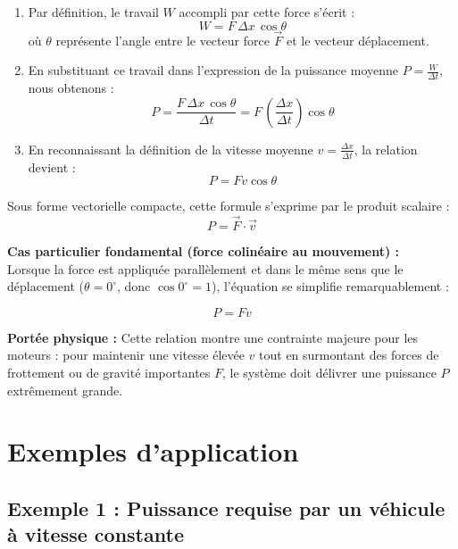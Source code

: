 \documentclass[11pt,openany]{book}
\begin{document}
\begin{enumerate}
    \item Par définition, le travail $W$ accompli par cette force s'écrit :
    \[
    W = F \, \Delta x \, \cos\theta
    \]
    où $\theta$ représente l'angle entre le vecteur force $\vec{F}$ et le vecteur déplacement.

    \item En substituant ce travail dans l'expression de la puissance moyenne $P = \frac{W}{\Delta t}$, nous obtenons :
    \[
    P = \frac{F \, \Delta x \, \cos\theta}{\Delta t} = F \, \left( \frac{\Delta x}{\Delta t} \right) \cos\theta
    \]

    \item En reconnaissant la définition de la vitesse moyenne $v = \frac{\Delta x}{\Delta t}$, la relation devient :
    \[
    \boxed{P = F v \cos\theta}
    \]
\end{enumerate}

Sous forme vectorielle compacte, cette formule s'exprime par le produit scalaire :
\[
\boxed{P = \vec{F} \cdot \vec{v}}
\]

\vspace{0.2cm}

\noindent\textbf{Cas particulier fondamental (force colinéaire au mouvement) :} \\
Lorsque la force est appliquée parallèlement et dans le même sens que le déplacement ($\theta = 0^\circ$, donc $\cos 0^\circ = 1$), l'équation se simplifie remarquablement :

\[
\boxed{P = F v}
\]

\vspace{0.2cm}

\noindent\textbf{Portée physique :} Cette relation montre une contrainte majeure pour les moteurs : pour maintenir une vitesse élevée $v$ tout en surmontant des forces de frottement ou de gravité importantes $F$, le système doit délivrer une puissance $P$ extrêmement grande.

\section{Exemples d'application}

\subsection*{Exemple 1 : Puissance requise par un véhicule à vitesse constante}
\end{document}
